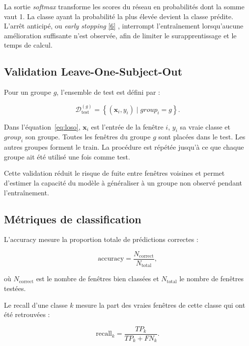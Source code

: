 \documentclass[12pt,a4paper]{article}
\newcommand{\openaccessref}[2]{%
  \nobreak\hspace{0.08em}%
  \href{#2}{\textcolor{green!35!black}{[#1]}}%
}
\begin{document}
La sortie \emph{softmax} transforme les scores du réseau en probabilités dont
la somme vaut 1. La classe ayant la probabilité la plus élevée devient la
classe prédite. L'arrêt anticipé, ou \emph{early stopping}\openaccessref{6}{https://www.deeplearningbook.org}, interrompt
l'entraînement lorsqu'aucune amélioration suffisante n'est observée, afin de
limiter le surapprentissage et le temps de calcul.

\subsection{Validation Leave-One-Subject-Out}

Pour un groupe $g$, l'ensemble de test est défini par :

\begin{equation}
\mathcal{D}^{(g)}_{\mathrm{test}}
=
\left\{
(\mathbf{x}_i,y_i)
\mid
group_i=g
\right\}.
\label{eq:loso}
\end{equation}

Dans l'équation~\ref{eq:loso}, $\mathbf{x}_i$ est l'entrée de la fenêtre $i$,
$y_i$ sa vraie classe et $group_i$ son groupe. Toutes les fenêtres du groupe
$g$ sont placées dans le test. Les autres groupes forment le train. La
procédure est répétée jusqu'à ce que chaque groupe ait été utilisé une fois
comme test.

Cette validation réduit le risque de fuite entre fenêtres voisines et permet
d'estimer la capacité du modèle à généraliser à un groupe non observé pendant
l'entraînement.

\subsection{Métriques de classification}

L'accuracy mesure la proportion totale de prédictions correctes :

\begin{equation}
\text{accuracy}
=
\frac{N_{\mathrm{correct}}}{N_{\mathrm{total}}},
\label{eq:accuracy}
\end{equation}

où $N_{\mathrm{correct}}$ est le nombre de fenêtres bien classées et
$N_{\mathrm{total}}$ le nombre de fenêtres testées.

Le recall d'une classe $k$ mesure la part des vraies fenêtres de cette classe
qui ont été retrouvées :

\begin{equation}
\text{recall}_k
=
\frac{TP_k}{TP_k+FN_k}.
\label{eq:recall}
\end{equation}
\end{document}
